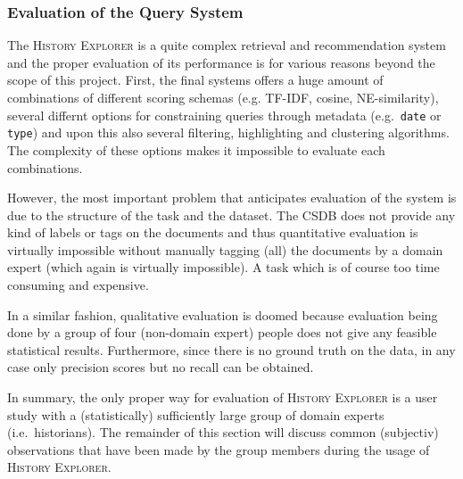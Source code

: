 \subsubsection{Evaluation of the Query System}
\label{sec:evaluation_of_the_query_system}
The \textsc{History Explorer} is a quite complex retrieval and recommendation system and the proper
evaluation of its performance is for various reasons beyond the scope of this project. First, the
final systems offers a huge amount of combinations of different scoring schemas (e.g. TF-IDF,
cosine, NE-similarity), several differnt options for constraining queries through metadata (e.g.\
\texttt{date} or \texttt{type}) and upon this also several filtering, highlighting and clustering
algorithms. The complexity of these options makes it impossible to evaluate each combinations.

However, the most important problem that anticipates evaluation of the system is due to the
structure of the task and the dataset. The CSDB does not provide any kind of labels or tags on the
documents and thus quantitative evaluation is virtually impossible without manually tagging (all)
the documents by a domain expert (which again is virtually impossible). A task which is of course
too time consuming and expensive.

In a similar fashion, qualitative evaluation is doomed because evaluation being done by a group of
four (non-domain expert) people does not give any feasible statistical results. Furthermore, since
there is no ground truth on the data, in any case only precision scores but no recall can be
obtained.

In summary, the only proper way for evaluation of \textsc{History Explorer} is a user study with a
(statistically) sufficiently large group of domain experts (i.e.\ historians). The remainder of
this section will discuss common (subjectiv) observations that have been made by the group members
during the usage of \textsc{History Explorer}.

